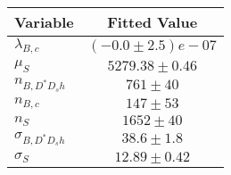 \begin{tabular}[t]{lc}
\hline
Variable &Fitted Value\\
\hline\hline
$\lambda_{B,c}$&$(-0.0\pm2.5)e-07$\\
\hline
$\mu_S$&$5279.38\pm0.46$\\
\hline
$n_{B, D^* D_s h}$&$761\pm40$\\
\hline
$n_{B,c}$&$147\pm53$\\
\hline
$n_S$&$1652\pm40$\\
\hline
$\sigma_{B, D^* D_s h}$&$38.6\pm1.8$\\
\hline
$\sigma_S$&$12.89\pm0.42$\\
\hline
\end{tabular}